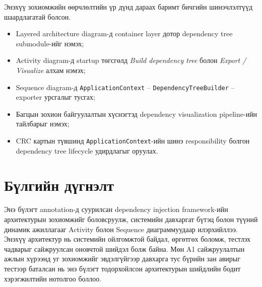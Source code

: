 Энэхүү зохиомжийн өөрчлөлтийн үр дүнд дараах баримт бичгийн шинэчлэлтүүд шаардлагатай болсон.
\begin{itemize}
    \item Layered architecture diagram-д container layer дотор dependency tree submodule-ийг нэмэх;
    \item Activity diagram-д startup төгсгөлд \textit{Build dependency tree} болон \textit{Export / Visualize} алхам нэмэх;
    \item Sequence diagram-д \texttt{ApplicationContext} -- \texttt{DependencyTreeBuilder} -- exporter урсгалыг тусгах;
    \item Багцын зохион байгуулалтын хүснэгтэд dependency visualization pipeline-ийн тайлбарыг нэмэх;
    \item CRC картын түвшинд \texttt{ApplicationContext}-ийн шинэ responsibility болгон dependency tree lifecycle удирдлагыг оруулах.
\end{itemize}

\section{Бүлгийн дүгнэлт}

Энэ бүлэгт annotation-д суурилсан dependency injection framework-ийн архитектурын зохиомжийг боловсруулж, системийн давхаргат бүтэц болон түүний динамик ажиллагааг Activity болон Sequence диаграммуудаар илэрхийллээ. Энэхүү архитектур нь системийн ойлгомжтой байдал, өргөтгөх боломж, тестлэх чадварыг сайжруулсан оновчтой шийдэл болж байна. Мөн A1 сайжруулалтын ажлын хүрээнд уг зохиомжийг эвдэлгүйгээр давхарга тус бүрийн зан авирыг тестээр баталсан нь энэ бүлэгт тодорхойлсон архитектурын шийдлийн бодит хэрэгжилтийн нотолгоо боллоо.
